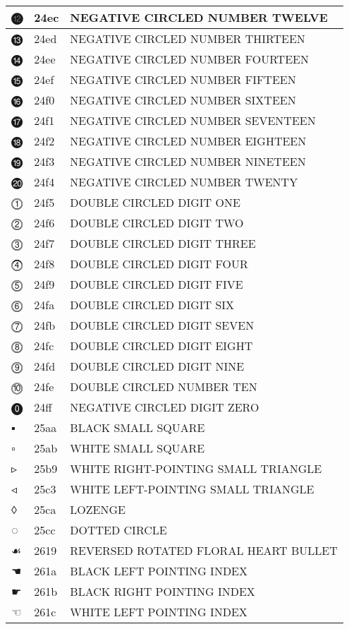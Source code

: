 \documentclass[12pt,letterpaper,openany]{book}
\begin{document}
\begin{center}
\begin{supertabular}{|m{0.25in}|m{0.5in}|m{4in}|}
			⓬ & 24ec & NEGATIVE CIRCLED NUMBER TWELVE\\\hline
			⓭ & 24ed & NEGATIVE CIRCLED NUMBER THIRTEEN\\\hline
			⓮ & 24ee & NEGATIVE CIRCLED NUMBER FOURTEEN\\\hline
			⓯ & 24ef & NEGATIVE CIRCLED NUMBER FIFTEEN\\\hline
			⓰ & 24f0 & NEGATIVE CIRCLED NUMBER SIXTEEN\\\hline
			⓱ & 24f1 & NEGATIVE CIRCLED NUMBER SEVENTEEN\\\hline
			⓲ & 24f2 & NEGATIVE CIRCLED NUMBER EIGHTEEN\\\hline
			⓳ & 24f3 & NEGATIVE CIRCLED NUMBER NINETEEN\\\hline
			⓴ & 24f4 & NEGATIVE CIRCLED NUMBER TWENTY\\\hline
			⓵ & 24f5 & DOUBLE CIRCLED DIGIT ONE\\\hline
			⓶ & 24f6 & DOUBLE CIRCLED DIGIT TWO\\\hline
			⓷ & 24f7 & DOUBLE CIRCLED DIGIT THREE\\\hline
			⓸ & 24f8 & DOUBLE CIRCLED DIGIT FOUR\\\hline
			⓹ & 24f9 & DOUBLE CIRCLED DIGIT FIVE\\\hline
			⓺ & 24fa & DOUBLE CIRCLED DIGIT SIX\\\hline
			⓻ & 24fb & DOUBLE CIRCLED DIGIT SEVEN\\\hline
			⓼ & 24fc & DOUBLE CIRCLED DIGIT EIGHT\\\hline
			⓽ & 24fd & DOUBLE CIRCLED DIGIT NINE\\\hline
			⓾ & 24fe & DOUBLE CIRCLED NUMBER TEN\\\hline
			⓿ & 24ff & NEGATIVE CIRCLED DIGIT ZERO\\\hline
			▪ & 25aa & BLACK SMALL SQUARE\\\hline
			▫ & 25ab & WHITE SMALL SQUARE\\\hline
			▹ & 25b9 & WHITE RIGHT-POINTING SMALL TRIANGLE\\\hline
			◃ & 25c3 & WHITE LEFT-POINTING SMALL TRIANGLE\\\hline
			◊ & 25ca & LOZENGE\\\hline
			◌ & 25cc & DOTTED CIRCLE\\\hline
			☙ & 2619 & REVERSED ROTATED FLORAL HEART BULLET\\\hline
			☚ & 261a & BLACK LEFT POINTING INDEX\\\hline
			☛ & 261b & BLACK RIGHT POINTING INDEX\\\hline
			☜ & 261c & WHITE LEFT POINTING INDEX\\\hline

\end{supertabular}
\end{center}
\end{document}
